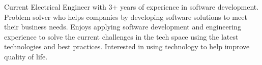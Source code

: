

\begin{cvparagraph}

Current Electrical Engineer with 3+ years of experience in software development. Problem solver who helps companies by developing software solutions to meet their business needs.
%
%
Enjoys applying software development and engineering experience to solve the current challenges in the tech space using the latest technologies and best practices. Interested in using technology to help improve quality of life.
\end{cvparagraph}
